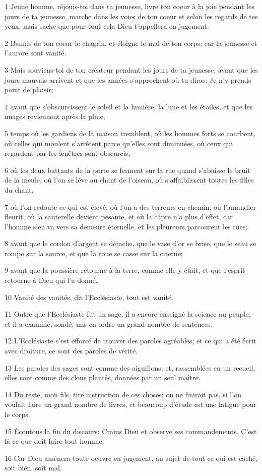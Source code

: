 \par 1 Jeune homme, réjouis-toi dans ta jeunesse, livre ton coeur à la joie pendant les jours de ta jeunesse, marche dans les voies de ton coeur et selon les regards de tes yeux; mais sache que pour tout cela Dieu t'appellera en jugement.
\par 2 Bannis de ton coeur le chagrin, et éloigne le mal de ton corps; car la jeunesse et l'aurore sont vanité.
\par 3 Mais souviens-toi de ton créateur pendant les jours de ta jeunesse, avant que les jours mauvais arrivent et que les années s'approchent où tu diras: Je n'y prends point de plaisir;
\par 4 avant que s'obscurcissent le soleil et la lumière, la lune et les étoiles, et que les nuages reviennent après la pluie,
\par 5 temps où les gardiens de la maison tremblent, où les hommes forts se courbent, où celles qui moulent s'arrêtent parce qu'elles sont diminuées, où ceux qui regardent par les fenêtres sont obscurcis,
\par 6 où les deux battants de la porte se ferment sur la rue quand s'abaisse le bruit de la meule, où l'on se lève au chant de l'oiseau, où s'affaiblissent toutes les filles du chant,
\par 7 où l'on redoute ce qui est élevé, où l'on a des terreurs en chemin, où l'amandier fleurit, où la sauterelle devient pesante, et où la câpre n'a plus d'effet, car l'homme s'en va vers sa demeure éternelle, et les pleureurs parcourent les rues;
\par 8 avant que le cordon d'argent se détache, que le vase d'or se brise, que le seau se rompe sur la source, et que la roue se casse sur la citerne;
\par 9 avant que la poussière retourne à la terre, comme elle y était, et que l'esprit retourne à Dieu qui l'a donné.
\par 10 Vanité des vanités, dit l'Ecclésiaste, tout est vanité.
\par 11 Outre que l'Ecclésiaste fut un sage, il a encore enseigné la science au peuple, et il a examiné, sondé, mis en ordre un grand nombre de sentences.
\par 12 L'Ecclésiaste s'est efforcé de trouver des paroles agréables; et ce qui a été écrit avec droiture, ce sont des paroles de vérité.
\par 13 Les paroles des sages sont comme des aiguillons; et, rassemblées en un recueil, elles sont comme des clous plantés, données par un seul maître.
\par 14 Du reste, mon fils, tire instruction de ces choses; on ne finirait pas, si l'on voulait faire un grand nombre de livres, et beaucoup d'étude est une fatigue pour le corps.
\par 15 Écoutons la fin du discours: Crains Dieu et observe ses commandements. C'est là ce que doit faire tout homme.
\par 16 Car Dieu amènera toute oeuvre en jugement, au sujet de tout ce qui est caché, soit bien, soit mal.


